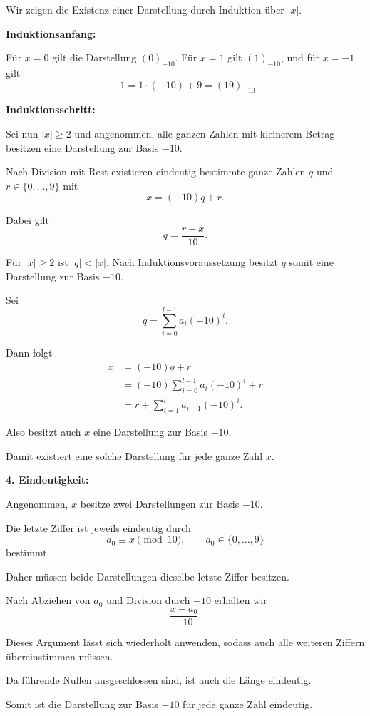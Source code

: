 \documentclass{report}
\begin{document}
\begin{myproof}
  Wir zeigen die Existenz einer Darstellung
  durch Induktion über $|x|$.

  \textbf{Induktionsanfang:}

  Für $x=0$ gilt die Darstellung $(0)_{-10}$.
  Für $x=1$ gilt $(1)_{-10}$, und für $x=-1$ gilt
  \[
    -1=1\cdot(-10)+9=(19)_{-10}.
  \]

  \textbf{Induktionsschritt:}

  Sei nun $|x|\ge2$ und angenommen, alle
  ganzen Zahlen mit kleinerem Betrag besitzen
  eine Darstellung zur Basis $-10$.

  Nach Division mit Rest existieren eindeutig
  bestimmte ganze Zahlen $q$ und
  $r\in\{0,\dots,9\}$ mit
  \[
    x=(-10)q+r.
  \]

  Dabei gilt
  \[
    q=\frac{r-x}{10}.
  \]

  Für $|x|\ge2$ ist $|q|<|x|$.
  Nach Induktionsvoraussetzung besitzt $q$
  somit eine Darstellung zur Basis $-10$.

  Sei
  \[
    q=\sum_{i=0}^{l-1}a_i(-10)^i.
  \]

  Dann folgt
  \begin{align*}
    x
    &=(-10)q+r\\
    &=(-10)\sum_{i=0}^{l-1}a_i(-10)^i+r\\
    &=r+\sum_{i=1}^{l}a_{i-1}(-10)^i.
  \end{align*}

  Also besitzt auch $x$ eine Darstellung
  zur Basis $-10$.

  Damit existiert eine solche Darstellung
  für jede ganze Zahl $x$.

  \medskip
  \textbf{4. Eindeutigkeit:}

  Angenommen, $x$ besitze zwei Darstellungen
  zur Basis $-10$.

  Die letzte Ziffer ist jeweils eindeutig durch
  \[
    a_0\equiv x\pmod{10},
    \qquad a_0\in\{0,\dots,9\}
  \]
  bestimmt.

  Daher müssen beide Darstellungen dieselbe
  letzte Ziffer besitzen.

  Nach Abziehen von $a_0$ und Division
  durch $-10$ erhalten wir
  \[
    \frac{x-a_0}{-10}.
  \]

  Dieses Argument lässt sich wiederholt
  anwenden, sodass auch alle weiteren
  Ziffern übereinstimmen müssen.

  Da führende Nullen ausgeschlossen sind,
  ist auch die Länge eindeutig.

  Somit ist die Darstellung zur Basis $-10$
  für jede ganze Zahl eindeutig.
\end{myproof}
\end{document}
